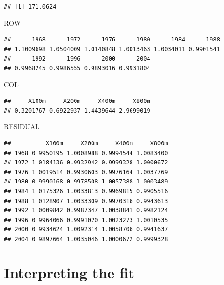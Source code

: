 \documentclass[
]{book}
\newenvironment{Shaded}{\begin{snugshade}}{\end{snugshade}}
\newcommand{\NormalTok}[1]{#1}
\begin{document}
\begin{verbatim}
## [1] 171.0624
\end{verbatim}

\begin{Shaded}
\begin{Highlighting}[]
\NormalTok{ROW}
\end{Highlighting}
\end{Shaded}

\begin{verbatim}
##      1968      1972      1976      1980      1984      1988 
## 1.1009698 1.0504009 1.0140848 1.0013463 1.0034011 0.9901541 
##      1992      1996      2000      2004 
## 0.9968245 0.9986555 0.9893016 0.9931804
\end{verbatim}

\begin{Shaded}
\begin{Highlighting}[]
\NormalTok{COL}
\end{Highlighting}
\end{Shaded}

\begin{verbatim}
##     X100m     X200m     X400m     X800m 
## 0.3201767 0.6922937 1.4439644 2.9699019
\end{verbatim}

\begin{Shaded}
\begin{Highlighting}[]
\NormalTok{RESIDUAL}
\end{Highlighting}
\end{Shaded}

\begin{verbatim}
##          X100m     X200m     X400m     X800m
## 1968 0.9950195 1.0008988 0.9994544 1.0083400
## 1972 1.0184136 0.9932942 0.9999328 1.0000672
## 1976 1.0019514 0.9930603 0.9976164 1.0037769
## 1980 0.9990168 0.9978508 1.0057388 1.0003489
## 1984 1.0175326 1.0033813 0.9969815 0.9905516
## 1988 1.0128907 1.0033309 0.9970316 0.9943613
## 1992 1.0009842 0.9987347 1.0038841 0.9982124
## 1996 0.9964066 0.9991020 1.0023273 1.0010535
## 2000 0.9934624 1.0092314 1.0058706 0.9941637
## 2004 0.9897664 1.0035046 1.0000672 0.9999328
\end{verbatim}

\hypertarget{interpreting-the-fit-1}{%
\section{Interpreting the fit}\label{interpreting-the-fit-1}}
\end{document}
